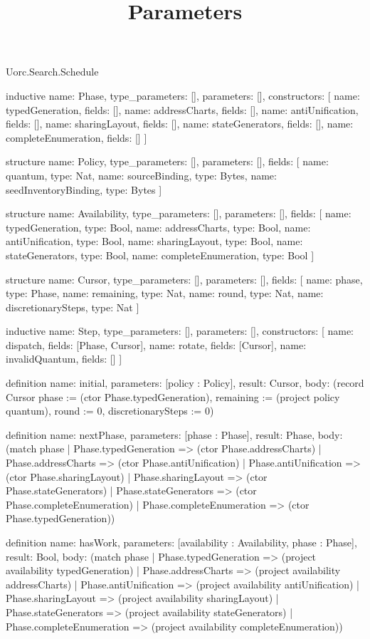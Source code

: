 \begin{lexlean}{Uorc.Search.Schedule}
\title{Parameters}
\begin{semanticmodule}
inductive{
  name: Phase,
  type_parameters: [],
  parameters: [],
  constructors: [
    {name: typedGeneration, fields: []},
    {name: addressCharts, fields: []},
    {name: antiUnification, fields: []},
    {name: sharingLayout, fields: []},
    {name: stateGenerators, fields: []},
    {name: completeEnumeration, fields: []}
  ]
}

structure{
  name: Policy,
  type_parameters: [],
  parameters: [],
  fields: [
    {name: quantum, type: Nat},
    {name: sourceBinding, type: Bytes},
    {name: seedInventoryBinding, type: Bytes}
  ]
}

structure{
  name: Availability,
  type_parameters: [],
  parameters: [],
  fields: [
    {name: typedGeneration, type: Bool},
    {name: addressCharts, type: Bool},
    {name: antiUnification, type: Bool},
    {name: sharingLayout, type: Bool},
    {name: stateGenerators, type: Bool},
    {name: completeEnumeration, type: Bool}
  ]
}

structure{
  name: Cursor,
  type_parameters: [],
  parameters: [],
  fields: [
    {name: phase, type: Phase},
    {name: remaining, type: Nat},
    {name: round, type: Nat},
    {name: discretionarySteps, type: Nat}
  ]
}

inductive{
  name: Step,
  type_parameters: [],
  parameters: [],
  constructors: [
    {name: dispatch, fields: [Phase, Cursor]},
    {name: rotate, fields: [Cursor]},
    {name: invalidQuantum, fields: []}
  ]
}

definition{
  name: initial,
  parameters: [policy : Policy],
  result: Cursor,
  body: (record Cursor {phase := (ctor Phase.typedGeneration), remaining := (project policy quantum), round := 0, discretionarySteps := 0})
}

definition{
  name: nextPhase,
  parameters: [phase : Phase],
  result: Phase,
  body: (match phase
    | Phase.typedGeneration => (ctor Phase.addressCharts)
    | Phase.addressCharts => (ctor Phase.antiUnification)
    | Phase.antiUnification => (ctor Phase.sharingLayout)
    | Phase.sharingLayout => (ctor Phase.stateGenerators)
    | Phase.stateGenerators => (ctor Phase.completeEnumeration)
    | Phase.completeEnumeration => (ctor Phase.typedGeneration))
}

definition{
  name: hasWork,
  parameters: [availability : Availability, phase : Phase],
  result: Bool,
  body: (match phase
    | Phase.typedGeneration => (project availability typedGeneration)
    | Phase.addressCharts => (project availability addressCharts)
    | Phase.antiUnification => (project availability antiUnification)
    | Phase.sharingLayout => (project availability sharingLayout)
    | Phase.stateGenerators => (project availability stateGenerators)
    | Phase.completeEnumeration => (project availability completeEnumeration))
}


\end{semanticmodule}
\end{lexlean}
